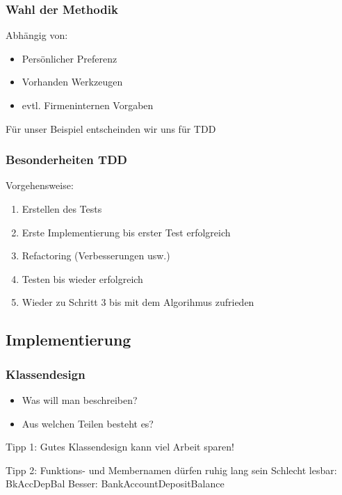 \documentclass{beamer}
\begin{document}
\begin{frame}[<+->]\frametitle{Wahl der Methodik}
	\pause
	Abhängig von:
	\begin{itemize}
		\item Persönlicher Preferenz
		\item Vorhanden Werkzeugen
		\item evtl. Firmeninternen Vorgaben
	\end{itemize}
	\pause
	Für unser Beispiel entscheinden wir uns für TDD
\end{frame}

\begin{frame}[<+->]\frametitle{Besonderheiten TDD}
    Vorgehensweise:
    \pause
	\begin{enumerate}
		\item Erstellen des Tests
		\item Erste Implementierung bis erster Test erfolgreich
		\item Refactoring (Verbesserungen usw.)
		\item Testen bis wieder erfolgreich
		\item Wieder zu Schritt 3 bis mit dem Algorihmus zufrieden 
	\end{enumerate}
\end{frame}

\subsection{Implementierung}

\begin{frame}[<+->]\frametitle{Klassendesign}
    \pause
    \begin{itemize}
    	\item Was will man beschreiben?
    	\item Aus welchen Teilen besteht es?
    \end{itemize}
    \pause
    \begin{block}{Tipp 1:}
    Gutes Klassendesign kann viel Arbeit sparen!
    \end{block}
    \pause
    \begin{block}{Tipp 2:}
    Funktions- und Membernamen dürfen ruhig lang sein\newline
    Schlecht lesbar: BkAccDepBal\newline
    Besser: BankAccountDepositBalance\newline
    \end{block}
\end{frame}
\end{document}
